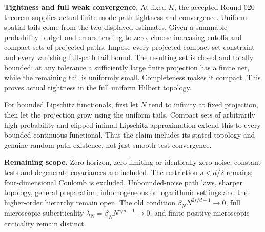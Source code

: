 \documentclass[11pt]{article}
\begin{document}
\noindent\textbf{Tightness and full weak convergence.}
At fixed $K$, the accepted Round 020 theorem supplies actual finite-mode path tightness and convergence. Uniform spatial tails come from the two displayed estimates. Given a summable probability budget and errors tending to zero, choose increasing cutoffs and compact sets of projected paths. Impose every projected compact-set constraint and every vanishing full-path tail bound. The resulting set is closed and totally bounded: at any tolerance a sufficiently large finite projection has a finite net, while the remaining tail is uniformly small. Completeness makes it compact. This proves actual tightness in the full uniform Hilbert topology.

For bounded Lipschitz functionals, first let $N$ tend to infinity at fixed projection, then let the projection grow using the uniform tails. Compact sets of arbitrarily high probability and clipped infimal Lipschitz approximation extend this to every bounded continuous functional. Thus the claim includes its stated topology and genuine random-path existence, not just smooth-test convergence.

\noindent\textbf{Remaining scope.}
Zero horizon, zero limiting or identically zero noise, constant tests and degenerate covariances are included. The restriction $s<d/2$ remains; four-dimensional Coulomb is excluded. Unbounded-noise path laws, sharper topology, general preparation, inhomogeneous or logarithmic settings and the higher-order hierarchy remain open. The old condition $\beta_NN^{2s/d-1}\to0$, full microscopic subcriticality $\lambda_N=\beta_NN^{s/d-1}\to0$, and finite positive microscopic criticality remain distinct.
\end{document}

